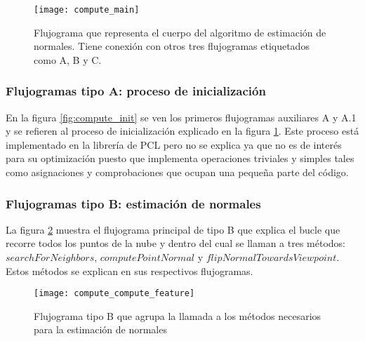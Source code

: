 \begin{figure}[h!]
\centering
\texttt{[image: compute\_main]}
\caption{Flujograma que representa el cuerpo del algoritmo de estimación de normales. Tiene conexión con otros tres flujogramas etiquetados como A, B y C.}\label{fig:compute_main}
\end{figure}

\subsubsection{Flujogramas tipo A: proceso de inicialización}
En la figura \ref{fig:compute_init} se ven los primeros flujogramas auxiliares A y A.1 y se refieren al proceso de inicialización explicado en la figura \ref{fig:compute_main}. Este proceso está implementado en la librería de PCL pero no se explica ya que no es de interés para su optimización puesto que implementa operaciones triviales y simples tales como asignaciones y comprobaciones que ocupan una pequeña parte del código.




\subsubsection{Flujogramas tipo B: estimación de normales}

La figura \ref{fig:compute_compute_feature} muestra el flujograma principal de tipo B que explica el bucle que recorre todos los puntos de la nube y dentro del cual se llaman a tres métodos: $searchForNeighbors$, $computePointNormal$ y $flipNormalTowardsViewpoint$. Estos métodos se explican en sus respectivos flujogramas.

\begin{figure}[h!]
\centering
\texttt{[image: compute\_compute\_feature]}
\caption{Flujograma tipo B que agrupa la llamada a los métodos necesarios para la estimación de normales}\label{fig:compute_compute_feature}
\end{figure}

